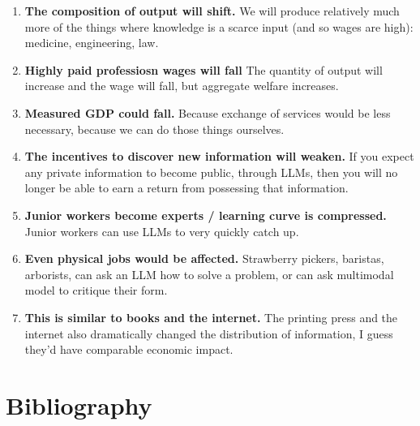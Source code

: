 \documentclass[
  11pt,
  letterpaper,
  DIV=11,
  numbers=noendperiod,
  oneside]{scrartcl}
\begin{document}
\begin{enumerate}
\def\labelenumi{\arabic{enumi}.}
\item
  \textbf{The composition of output will shift.} We will produce
  relatively much more of the things where knowledge is a scarce input
  (and so wages are high): medicine, engineering, law.
\item
  \textbf{Highly paid professiosn wages will fall} The quantity of
  output will increase and the wage will fall, but aggregate welfare
  increases.
\item
  \textbf{Measured GDP could fall.} Because exchange of services would
  be less necessary, because we can do those things ourselves.
\item
  \textbf{The incentives to discover new information will weaken.} If
  you expect any private information to become public, through LLMs,
  then you will no longer be able to earn a return from possessing that
  information.
\item
  \textbf{Junior workers become experts / learning curve is compressed.}
  Junior workers can use LLMs to very quickly catch up.
\item
  \textbf{Even physical jobs would be affected.} Strawberry pickers,
  baristas, arborists, can ask an LLM how to solve a problem, or can ask
  multimodal model to critique their form.
\item
  \textbf{This is similar to books and the internet.} The printing press
  and the internet also dramatically changed the distribution of
  information, I guess they'd have comparable economic impact.
\end{enumerate}

\newpage

\newpage

\section*{Bibliography}\label{bibliography}
\end{document}
